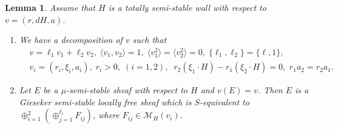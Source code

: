 \documentclass[10pt]{amsart}
\def\cal{\mathcal}
\numberwithin{equation}{section}
\theoremstyle{plain}
\newtheorem{lem}[thm]{Lemma}
\theoremstyle{definition}
\theoremstyle{remark}
\begin{document}
\begin{lem}\label{lem:tssH}
Assume that $H$ is a totally semi-stable wall with respect to $v=(r,dH,a)$.
\begin{enumerate}
\item
[(1)]
We have a decomposition of $v$ such that
\begin{equation}
\begin{split}
& v=\ell_1 v_1+\ell_2 v_2,\;\langle v_1,v_2 \rangle=1,\; \langle v_1^2 \rangle=\langle v_2^2 \rangle=0,\;
 \{\ell_1,\ell_2 \}=\{ \ell,1 \},\\
& v_i=(r_i,\xi_i,a_i),\;r_i>0,\; (i=1,2),\;\; r_2(\xi_1 \cdot H)-r_1(\xi_2 \cdot H)=0, \,\,
r_1 a_2=r_2 a_1.
\end{split}
\end{equation}
\item[(2)]
Let $E$ be a $\mu$-semi-stable sheaf with respect to $H$ and
$v(E)=v$. Then
$E$ is a Gieseker semi-stable locally free sheaf which is $S$-equivalent to
$\oplus_{i=1}^2 (\oplus_{j=1}^{\ell_i} F_{ij})$,
where $F_{ij} \in {\cal M}_H(v_i)$.
\end{enumerate}
\end{lem}
\end{document}

